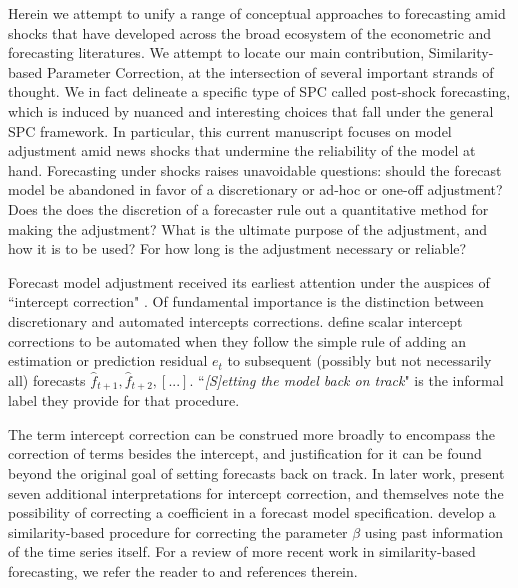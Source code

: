 \documentclass{uiucthesis2021}
\theoremstyle{definition}
\begin{document}
  Herein we attempt to unify a range of conceptual approaches to forecasting amid shocks that have developed across the broad ecosystem of the econometric and forecasting literatures.  We attempt to locate our main contribution, Similarity-based Parameter Correction, at the intersection of several important strands of thought.  We in fact delineate a specific type of SPC called post-shock forecasting, which is induced by nuanced and interesting choices that fall under the general SPC framework.  In particular, this current manuscript focuses on model adjustment amid news shocks that undermine the reliability of the  model at hand.  Forecasting under shocks raises unavoidable questions: should the forecast model be abandoned in favor of a discretionary or ad-hoc or one-off adjustment?  Does the does the discretion of a forecaster rule out a quantitative method for making the adjustment?  What is the ultimate purpose of the adjustment, and how it is to be used?  For how long is the adjustment necessary or reliable?
  
  Forecast model adjustment received its earliest attention under the auspices of ``intercept correction" \parencite[][]{hendry1994theory,clements1996intercept,clements1998forecasting, clements1999forecasting}.  Of fundamental importance is the distinction between discretionary and automated intercepts corrections. \cite[][]{hendry1994theory} define scalar intercept corrections to be automated when they follow the simple rule of adding an estimation or prediction residual $e_{t}$ to subsequent (possibly but not necessarily all) forecasts $\hat f_{t+1},\hat f_{t+2},[...].$ ``\textit{[S]etting the model back on track}" is the informal label they provide for that procedure. 
   
  The term intercept correction can be construed more broadly to encompass the correction of terms besides the intercept, and justification for it can be found beyond the original goal of setting forecasts back on track.  In later work, \cite[][]{clements1999forecasting} present seven additional interpretations for intercept correction, and \cite[][]{hendry1994theory, clements1999forecasting} themselves note the possibility of correcting a coefficient in a forecast model specification. \cite[][]{guerron2017macroeconomic} develop a similarity-based procedure for correcting the parameter $\beta$ using past information of the time series itself.   For a review of more recent work in similarity-based forecasting, we refer the reader to \cite[][]{lundquist2024volatility} and references therein.
  
\end{document}
